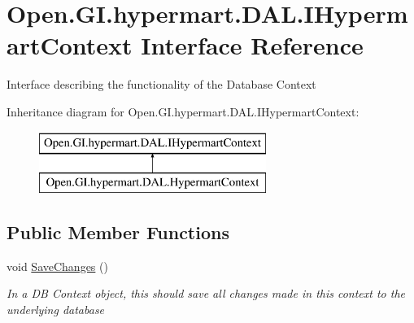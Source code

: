 \hypertarget{interface_open_1_1_g_i_1_1hypermart_1_1_d_a_l_1_1_i_hypermart_context}{}\section{Open.\+G\+I.\+hypermart.\+D\+A\+L.\+I\+Hypermart\+Context Interface Reference}
\label{interface_open_1_1_g_i_1_1hypermart_1_1_d_a_l_1_1_i_hypermart_context}


Interface describing the functionality of the Database Context  


Inheritance diagram for Open.\+G\+I.\+hypermart.\+D\+A\+L.\+I\+Hypermart\+Context\+:\begin{figure}[H]
\begin{center}
\leavevmode
\includegraphics[height=2.000000cm]{interface_open_1_1_g_i_1_1hypermart_1_1_d_a_l_1_1_i_hypermart_context}
\end{center}
\end{figure}
\subsection*{Public Member Functions}
\begin{DoxyCompactItemize}
\item 
void \hyperlink{interface_open_1_1_g_i_1_1hypermart_1_1_d_a_l_1_1_i_hypermart_context_aacc5015260d97950f2a10d7673873304}{Save\+Changes} ()
\begin{DoxyCompactList}\small\item\em In a D\+B Context object, this should save all changes made in this context to the underlying database \end{DoxyCompactList}\end{DoxyCompactItemize}

